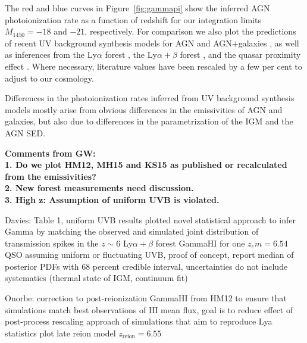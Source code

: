 \documentclass[fleqn,usenatbib]{mnras}
\begin{document}
The red and blue curves in Figure~\ref{fig:gammapi} show the inferred
AGN  photoionization rate as a function of redshift for our
integration limits $M_{1450}=-18$ and $-21$, respectively. For
comparison we also plot the predictions of recent UV background
synthesis models for AGN
\citep{2012ApJ...746..125H,2015ApJ...813L...8M,2015MNRAS.451L..30K}
and AGN$+$galaxies \citep{2012ApJ...746..125H,2018arXiv180104931P}, as
well as inferences from the  Ly$\alpha$ forest
\citep{2011MNRAS.412.1926W,2013MNRAS.436.1023B,2017MNRAS.467.3172G,2018MNRAS.473..560D},
the Ly$\alpha+\beta$ forest \citep{2018ApJ...855..106D}, and the
quasar proximity effect \citep{2011MNRAS.412.2543C}.  Where necessary,
literature values have been rescaled by a few per cent to adjust to
our cosmology.

Differences in the  photoionization rates inferred from UV
background synthesis models mostly arise from obvious differences in
the emissivities of AGN and galaxies, but also due to differences in
the parametrization of the IGM and the AGN SED.

\textbf{Comments from GW:\\
1. Do we plot HM12, MH15 and KS15 as published or recalculated from the emissivities?\\
2. New forest measurements need discussion.\\
3. High z: Assumption of uniform UVB is violated.
}





Davies: Table 1, uniform UVB results plotted
novel statistical approach to infer Gamma by matching the observed and simulated joint distribution of transmission spikes in the $z\sim 6$ Ly$\alpha+\beta$ forest
GammaHI for one $z_em=6.54$QSO assuming uniform or fluctuating UVB, proof of concept,
report median of posterior PDFs with 68 percent credible interval, uncertainties do not include systematics (thermal state of IGM, continuum fit)

Onorbe:
correction to post-reionization GammaHI from HM12 to ensure that simulations match best observations of HI mean flux, goal is to reduce effect of post-process rescaling approach of simulations that aim to reproduce Lya statistics
plot late reion model $z_\mathrm{reion}=6.55$
\end{document}
